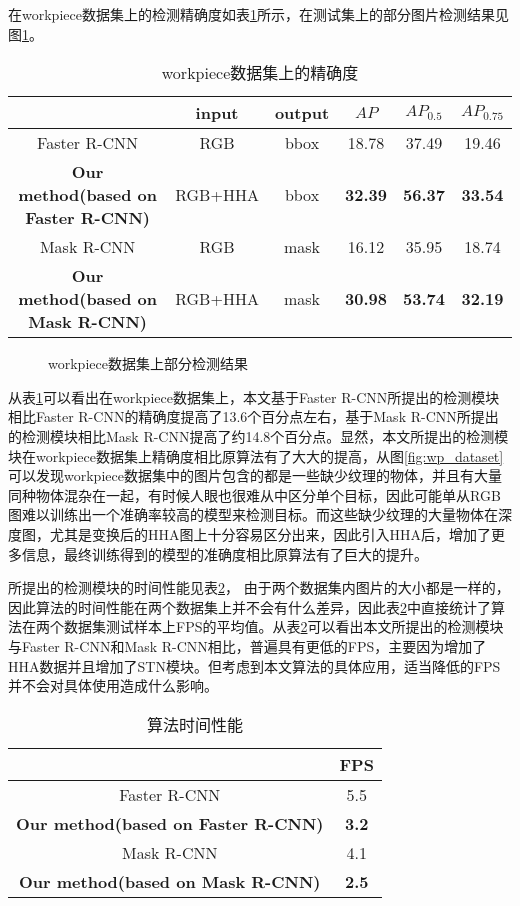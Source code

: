 在workpiece数据集上的检测精确度如表\ref{tab:ap2}所示，在测试集上的部分图片检测结果见图\ref{fig:wp_res}。
\begin{table}[ht]
  \centering
  \caption{workpiece数据集上的精确度}
    \begin{tabular}{cccccc}
      \toprule
      &input&output&$AP$&$AP_{0.5}$&$AP_{0.75}$ \\
      \midrule
      Faster R-CNN&RGB&bbox&18.78&37.49&19.46 \\
      \bf{Our method(based on Faster R-CNN)}&RGB+HHA&bbox&\bf{32.39}&\bf{56.37}&\bf{33.54} \\
      Mask R-CNN&RGB&mask&16.12&35.95&18.74 \\
      \bf{Our method(based on Mask R-CNN)}&RGB+HHA&mask&\bf{30.98}&\bf{53.74}&\bf{32.19} \\
      \bottomrule
    \end{tabular}
  \label{tab:ap2}
\end{table}
\begin{figure}[ht]
  \centering
  \hskip0.2cm
  \hskip0.2cm
  \caption{workpiece数据集上部分检测结果}
  \label{fig:wp_res}
\end{figure}
从表\ref{tab:ap2}可以看出在workpiece数据集上，本文基于Faster R-CNN所提出的检测模块相比Faster R-CNN的精确度提高了13.6个百分点左右，基于Mask R-CNN所提出的检测模块相比Mask R-CNN提高了约14.8个百分点。显然，本文所提出的检测模块在workpiece数据集上精确度相比原算法有了大大的提高，从图\ref{fig:wp_dataset}可以发现workpiece数据集中的图片包含的都是一些缺少纹理的物体，并且有大量同种物体混杂在一起，有时候人眼也很难从中区分单个目标，因此可能单从RGB图难以训练出一个准确率较高的模型来检测目标。而这些缺少纹理的大量物体在深度图，尤其是变换后的HHA图上十分容易区分出来，因此引入HHA后，增加了更多信息，最终训练得到的模型的准确度相比原算法有了巨大的提升。

所提出的检测模块的时间性能见表\ref{tab:fps}，
由于两个数据集内图片的大小都是一样的，因此算法的时间性能在两个数据集上并不会有什么差异，因此表\ref{tab:fps}中直接统计了算法在两个数据集测试样本上FPS的平均值。从表\ref{tab:fps}可以看出本文所提出的检测模块与Faster R-CNN和Mask R-CNN相比，普遍具有更低的FPS，主要因为增加了HHA数据并且增加了STN模块。但考虑到本文算法的具体应用，适当降低的FPS并不会对具体使用造成什么影响。
\begin{table}[ht]
  \centering
  \caption{算法时间性能}
  \begin{tabular}{cc}
    \toprule
    &FPS \\
    \midrule
    Faster R-CNN&5.5 \\
    \bf{Our method(based on Faster R-CNN)}&\bf{3.2} \\
    Mask R-CNN&4.1 \\
    \bf{Our method(based on Mask R-CNN)}&\bf{2.5} \\
    \bottomrule
  \end{tabular}
  \label{tab:fps}
\end{table}

